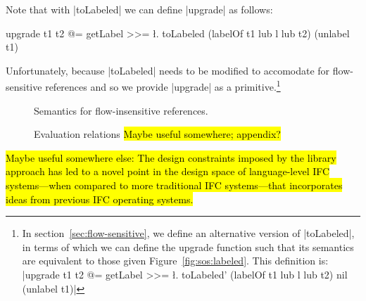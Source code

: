 Note that with |toLabeled| we can define |upgrade| as follows:
\begin{code}
upgrade t1 t2 @= getLabel >>= \l.
  toLabeled (labelOf t1 lub l lub t2) (unlabel t1)
\end{code}
Unfortunately, because |toLabeled| needs to be modified to accomodate
for flow-sensitive references and so we provide |upgrade| as a
primitive.\footnote{
In section~\ref{sec:flow-sensitive}, we define an alternative
version of |toLabeled|, in terms of which we can define the
upgrade function such that its semantics are equivalent to those
given Figure~\ref{fig:sos:labeled}. This definition is:
|upgrade t1 t2 @= getLabel >>= \l.
  toLabeled' (labelOf t1 lub l lub t2) nil (unlabel t1)|
}

\begin{figure}[!ht]
\small
{}
\caption{Semantics for flow-insensitive references\label{fig:sos:refs}.}
\end{figure}



\begin{figure}[h!]
\small
{}
\caption{Evaluation relations \hl{ Maybe useful somewhere; appendix? } }
\end{figure}


\hl{
Maybe useful somewhere else:
The design constraints imposed by the library approach has led to a
novel point in the design space of language-level IFC systems---when
compared to more traditional IFC systems---that incorporates ideas
from previous IFC operating systems.
}
